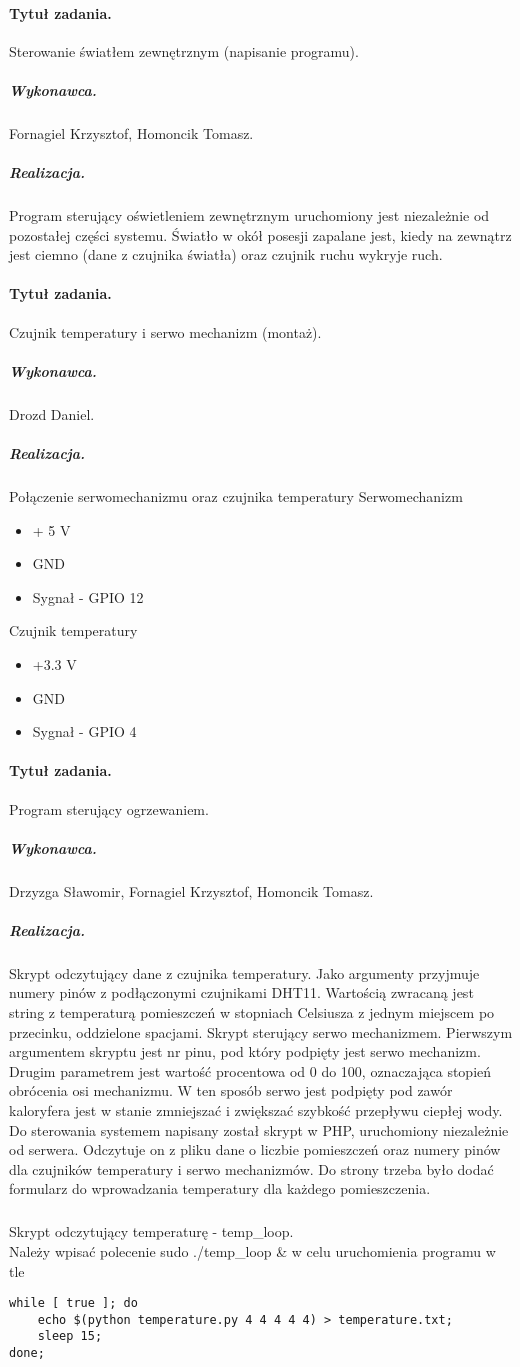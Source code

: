 \paragraph{Tytuł zadania.} Sterowanie światłem zewnętrznym (napisanie programu).
\subparagraph{Wykonawca.} Fornagiel Krzysztof, Homoncik Tomasz.
\subparagraph{Realizacja.} Program sterujący oświetleniem zewnętrznym uruchomiony jest niezależnie od pozostałej części systemu. Światło w okół posesji zapalane jest, kiedy na zewnątrz jest ciemno (dane z czujnika światła) oraz czujnik ruchu wykryje ruch.

\paragraph{Tytuł zadania.} Czujnik temperatury i serwo mechanizm (montaż).
\subparagraph{Wykonawca.} Drozd Daniel.
\subparagraph{Realizacja.} Połączenie serwomechanizmu oraz czujnika temperatury
Serwomechanizm

\begin{itemize}
	\item + 5 V
	\item GND
	\item Sygnał - GPIO 12
\end{itemize}
Czujnik temperatury
\begin{itemize}
	\item +3.3 V
	\item GND
	\item Sygnał - GPIO 4
\end{itemize}


\paragraph{Tytuł zadania.} Program sterujący ogrzewaniem.
\subparagraph{Wykonawca.} Drzyzga Sławomir, Fornagiel Krzysztof, Homoncik Tomasz.
\subparagraph{Realizacja.} Skrypt odczytujący dane z czujnika temperatury. Jako argumenty przyjmuje numery pinów z podłączonymi czujnikami DHT11. Wartością zwracaną jest string z temperaturą pomieszczeń w stopniach Celsiusza z jednym miejscem po przecinku, oddzielone spacjami. 
\break
Skrypt sterujący serwo mechanizmem. Pierwszym argumentem skryptu jest nr pinu, pod który podpięty jest serwo mechanizm. Drugim parametrem jest wartość procentowa od 0 do 100, oznaczająca stopień obrócenia osi mechanizmu. W ten sposób serwo jest podpięty pod zawór kaloryfera jest w stanie zmniejszać i zwiększać szybkość przepływu ciepłej wody.
\break
Do sterowania systemem napisany został skrypt w PHP, uruchomiony niezależnie od serwera. Odczytuje on z pliku dane o liczbie pomieszczeń oraz numery pinów dla czujników temperatury i serwo mechanizmów.
Do strony trzeba było dodać formularz do wprowadzania temperatury dla każdego pomieszczenia.
\subparagraph{}
Skrypt odczytujący temperaturę - temp\_loop. \\
Należy wpisać polecenie sudo ./temp\_loop \& w celu uruchomienia programu w tle
\begin{verbatim}
while [ true ]; do 
	echo $(python temperature.py 4 4 4 4 4) > temperature.txt; 
	sleep 15; 
done;
\end{verbatim}


